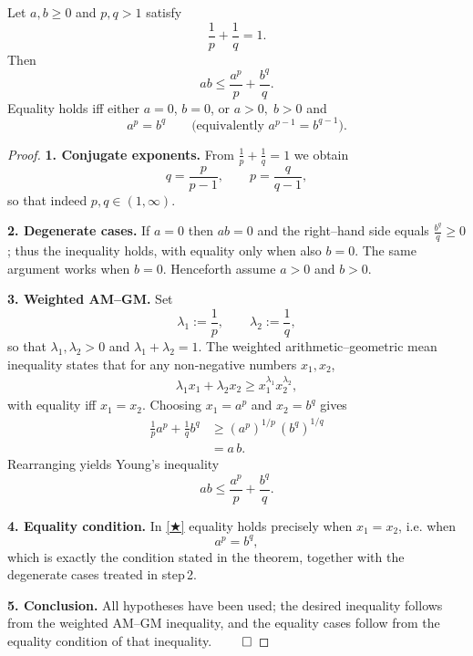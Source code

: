 \begin{theorem}
Let \(a,b\ge 0\) and \(p,q>1\) satisfy  
\[
\frac{1}{p}+\frac{1}{q}=1 .
\]
Then  
\[
ab\le \frac{a^{p}}{p}+\frac{b^{q}}{q}.
\]
Equality holds iff either \(a=0\), \(b=0\), or \(a>0,\;b>0\) and  
\[
a^{p}=b^{q}\qquad\bigl(\text{equivalently } a^{p-1}=b^{q-1}\bigr).
\]
\end{theorem}

\begin{proof}
\textbf{1. Conjugate exponents.}  
From \(\frac{1}{p}+\frac{1}{q}=1\) we obtain  
\[
q=\frac{p}{p-1},\qquad p=\frac{q}{q-1},
\]
so that indeed \(p,q\in(1,\infty)\).

\medskip

\textbf{2. Degenerate cases.}  
If \(a=0\) then \(ab=0\) and the right–hand side equals \(\frac{b^{q}}{q}\ge0\); thus the inequality holds, with equality only when also \(b=0\).  
The same argument works when \(b=0\).  
Henceforth assume \(a>0\) and \(b>0\).

\medskip

\textbf{3. Weighted AM–GM.}  
Set  
\[
\lambda_{1}:=\frac{1}{p},\qquad \lambda_{2}:=\frac{1}{q},
\]
so that \(\lambda_{1},\lambda_{2}>0\) and \(\lambda_{1}+\lambda_{2}=1\).  
The weighted arithmetic–geometric mean inequality states that for any non‑negative numbers \(x_{1},x_{2}\),
\begin{align}
\lambda_{1}x_{1}+\lambda_{2}x_{2}\ge x_{1}^{\lambda_{1}}x_{2}^{\lambda_{2}},
\tag{★}
\end{align}
with equality iff \(x_{1}=x_{2}\).  
Choosing \(x_{1}=a^{p}\) and \(x_{2}=b^{q}\) gives
\begin{align*}
\frac{1}{p}a^{p}+\frac{1}{q}b^{q}
&\ge (a^{p})^{1/p}\,(b^{q})^{1/q} \\
&= a\,b .
\end{align*}
Rearranging yields Young’s inequality
\[
ab\le\frac{a^{p}}{p}+\frac{b^{q}}{q}.
\]

\medskip

\textbf{4. Equality condition.}  
In \eqref{★} equality holds precisely when \(x_{1}=x_{2}\), i.e. when  
\[
a^{p}=b^{q},
\]
which is exactly the condition stated in the theorem, together with the degenerate cases treated in step 2.

\medskip

\textbf{5. Conclusion.}  
All hypotheses have been used; the desired inequality follows from the weighted AM–GM inequality, and the equality cases follow from the equality condition of that inequality. \(\qed\)
\end{proof}